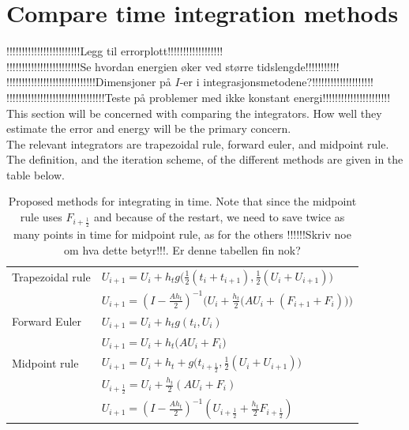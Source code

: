 \chapter{Compare time integration methods}
!!!!!!!!!!!!!!!!!!!!!!!!Legg til errorplott!!!!!!!!!!!!!!!!!!\\
!!!!!!!!!!!!!!!!!!!!!!!!Se hvordan energien øker ved større tidslengde!!!!!!!!!!!\\
!!!!!!!!!!!!!!!!!!!!!!!!!!!!!Dimensjoner på $I$-er i integrasjonsmetodene?!!!!!!!!!!!!!!!!!!!!\\
!!!!!!!!!!!!!!!!!!!!!!!!!!!!!!!!Teste på problemer med ikke konstant energi!!!!!!!!!!!!!!!!!!!!!!\\
This section will be concerned with comparing the integrators. How well they estimate the error and energy will be the primary concern.\\

The relevant integrators are trapezoidal rule, forward euler, and midpoint rule. The definition, and the iteration scheme, of the different methods are given in the table below. 

\begin{table}
\begin{tabular}{l l}
	Trapezoidal rule \cite{trapezoidal} & $U_{i+1} = U_{i}+h_t g \Big( \frac{1}{2}(t_i+t_{i+1}),\frac{1}{2}(U_i+U_{i+1}) \Big)$
	\\ & $U_{i+1} = (I- \frac{A h_t}{2}) ^{-1} \Big(  U_i + \frac{h_t}{2} \big( A U_i+(F_{i+1}+F_i) \big)  \Big) $\\
	Forward Euler \cite{forwardeuler} & $ U_{i+1} = U_i + h_t g ( t_i, U_i ) $ \\ & $ U_{i+1} = U_i + h_t \big( A U_i + F_i \big) $ \\
	Midpoint rule \cite{midpoint} & $U_{i+1} = U_i + h_t + g \Big(  t_{i+\frac{1}{2}} , \frac{1}{2}(U_i + U_{i+1})    \Big) $ \\ & 
	$U_{i+\frac{1}{2}} = U_i + \frac{h_t}{2} ( A U_i + F_i )$ \\ &
    $U_{i+1} = (I-\frac{A h_t}{2}) ^{-1} (U_{i+\frac{1}{2}} + \frac{h_t}{2} F_{i+ \frac{1}{2}})$
\end{tabular}
\label{tab:intmet}
\caption{ Proposed methods for integrating in time. Note that since the midpoint rule uses $F_{i+\frac{1}{2}}$ and because of the restart, we need to save twice as many points in time for midpoint rule, as for the others !!!!!!Skriv noe om hva dette betyr!!!. Er denne tabellen fin nok?}
\end{table}

